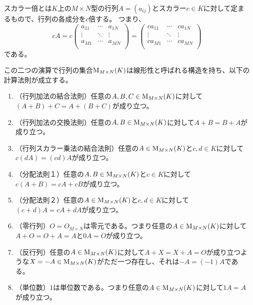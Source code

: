 スカラー倍とは$K$上の$M\times N$型の行列$A = (a_{i j})$とスカラー$c \in K$に対して定まるもので、行列の各成分を$c$倍する。
つまり、
$$
c A =
c
\begin{pmatrix}
a_{1 1} & \cdots & a_{1 N} \\
\vdots & \ddots & \vdots \\
a_{M 1} & \cdots & a_{M N} \\
\end{pmatrix}
=
\begin{pmatrix}
c a_{1 1} & \cdots & c a_{1 N} \\
\vdots & \ddots & \vdots \\
c a_{M 1} & \cdots & c a_{M N} \\
\end{pmatrix}
$$
である。

この二つの演算で行列の集合$\mathrm{M}_{M\times N}(K)$は線形性と呼ばれる構造を持ち、以下の計算法則が成立する。

\begin{enumerate}
\item
（行列加法の結合法則）任意の$A, B, C \in \mathrm{M}_{M\times N}(K)$に対して$(A+B)+C = A+(B+C)$が成り立つ。
\item
（行列加法の交換法則）任意の$A, B \in \mathrm{M}_{M\times N}(K)$に対して$A+B = B+A$が成り立つ。
\item
（行列スカラー乗法の結合法則）任意の$A \in \mathrm{M}_{M\times N}(K)$と$c, d \in K$に対して$c(d A) = (c d)A$が成り立つ。
\item
（分配法則１）任意の$A, B \in \mathrm{M}_{M\times N}(K)$と$c \in K$に対して$c(A+B) = c A+c B$が成り立つ。
\item
（分配法則２）任意の$A \in \mathrm{M}_{M\times N}(K)$と$c, d \in K$に対して$(c+d)A = c A+d A$が成り立つ。
\item
（零行列）$O = O_{M\times N}$は零元である。つまり任意の$A \in \mathrm{M}_{M\times N}(K)$に対して$A+O = O+A = A$と$0 A = O$が成り立つ。
\item
（反行列）任意の$A \in \mathrm{M}_{M\times N}(K)$に対して$A+X = X+A = O$が成り立つような$X = -A \in \mathrm{M}_{M\times N}(K)$がただ一つ存在し、それは$-A = (-1)A$である。
\item
（単位数）$1$は単位数である。つまり任意の$A \in \mathrm{M}_{M\times N}(K)$に対して$1 A = A$が成り立つ。
\end{enumerate}

